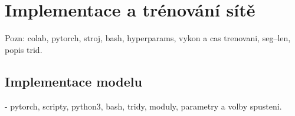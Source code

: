 



\chapter{Implementace a trénování sítě}
\label{implementace}
Pozn: colab, pytorch, stroj, bash, hyperparams, vykon a cas trenovani, seg--len, popis trid.

\section{Implementace modelu}
- pytorch, scripty, python3, bash, tridy, moduly, parametry a volby spusteni.

